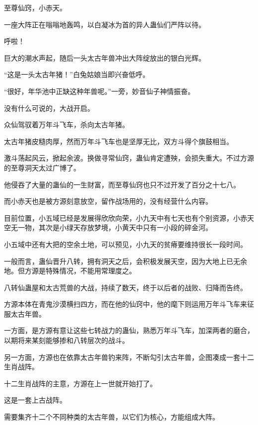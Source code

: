 
\begin{this_body}



至尊仙窍，小赤天。

一座大阵正在嗡嗡地轰鸣，以白凝冰为首的异人蛊仙们严阵以待。

呼啦！

巨大的潮水声起，随后一头太古年兽冲出大阵绽放出的银白光辉。

“这是一头太古年猪！”白兔姑娘当即兴奋低呼。

“很好，年华池中正缺这种年兽呢。”一旁，妙音仙子神情振奋。

没有什么可说的，大战开启。

众仙驾驭着万年斗飞车，杀向太古年猪。

太古年猪皮糙肉厚，然而万年斗飞车也是坚厚无比，双方斗得个旗鼓相当。

激斗荡起风云，掀起余波。换做寻常仙窍，蛊仙肯定遭殃，会损失重大。不过方源的至尊洞天太过广博了。

他侵吞了大量的蛊仙的一生财富，而至尊仙窍也只不过开发了百分之十七八。

而小赤天也是被方源刻意放空，留作战场用的，没有经营什么内容。

目前位置，小五域已经是发展得欣欣向荣，小九天中有七天也有个别资源，小赤天空无一物，其次是小绿天存放梦境，小黄天中只有一小段的碎金河。

小五域中还有大把的空余土地，可以预见，小九天的贫瘠要维持很长一段时间。

一般而言，蛊仙晋升八转，拥有洞天之后，会积极发展天空，因为大地上已无余地。但方源是特殊情况，不能用常理度之。

八转仙蛊屋和太古荒兽的大战，持续了数天，终于以后者的战败、归降而告终。

方源本体在青鬼沙漠横扫四方，而在他的仙窍中，他的麾下则运用万年斗飞车来征服太古年兽。

一方面，是方源有意让这些七转战力的蛊仙，熟悉万年斗飞车，加深两者的磨合，以期将来某刻能够掺和八转层次的战斗。

另一方面，方源也在依靠太古年兽钓来阵，不断勾引太古年兽，企图凑成一套十二生肖战阵。

十二生肖战阵的主意，方源在上一世就开始打了。

这是一套上古战阵。

需要集齐十二个不同种类的太古年兽，以它们为核心，方能组成大阵。


\end{this_body}
